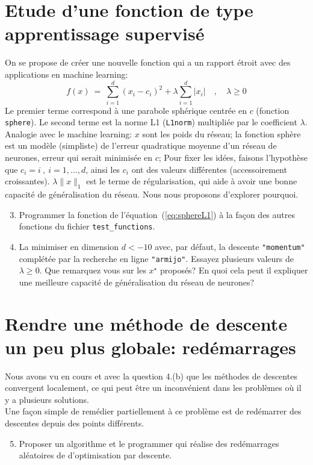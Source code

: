 \documentclass[12pt]{article}
\begin{document}
\section*{Etude d'une fonction de type apprentissage supervisé}
On se propose de créer une nouvelle fonction qui a un rapport étroit avec des applications en machine learning:
\begin{equation}
f(x) ~=~ \sum_{i=1}^d (x_i-c_i)^2 + \lambda \sum_{i=1}^d \lvert x_i \rvert \quad,\quad \lambda \ge 0
\label{eq:sphereL1}
\end{equation}
Le premier terme correspond à une parabole sphérique centrée en $c$ (fonction \texttt{sphere}). 
Le second terme est la norme L1 (\texttt{L1norm}) multipliée par le coefficient $\lambda$.\\
Analogie avec le machine learning: $x$ sont les poids du réseau; 
la fonction sphère est un modèle (simpliste) de l'erreur quadratique moyenne d'un réseau de neurones, erreur qui serait minimisée en $c$; 
Pour fixer les idées, faisons l'hypothèse que $c_i = i~,~i=1,\ldots,d$, ainsi les $c_i$ ont des valeurs différentes (accessoirement croissantes).
$\lambda \lVert x \rVert_1$ est le terme de régularisation, qui aide à avoir une bonne capacité de généralisation du réseau. 
Nous nous proposons d'explorer pourquoi.
\begin{enumerate}
\setcounter{enumi}{2}
\item Programmer la fonction de l'équation~(\ref{eq:sphereL1}) à la façon des autres fonctions du fichier \texttt{test_functions}.
\item La minimiser en dimension $d<-10$ avec, par défaut, la descente \texttt{"momentum"} complétée par la recherche en ligne \texttt{"armijo"}. 
Essayez plusieurs valeurs de $\lambda \ge 0$.
Que remarquez vous sur les $x^\star$ proposés? En quoi cela peut il expliquer une meilleure capacité de généralisation du réseau de neurones?
\end{enumerate}


\section*{Rendre une méthode de descente un peu plus globale: redémarrages}
Nous avons vu en cours et avec la question 4.(b) que les méthodes de descentes convergent localement, ce qui peut être
un inconvénient dans les problèmes où il y a plusieurs solutions.\\
Une façon simple de remédier partiellement à ce problème est de redémarrer des descentes depuis des points différents.
\begin{enumerate}
\setcounter{enumi}{4}
\item Proposer un algorithme et le programmer qui réalise des redémarrages aléatoires de d'optimisation par descente.
\end{enumerate}
\end{document}
